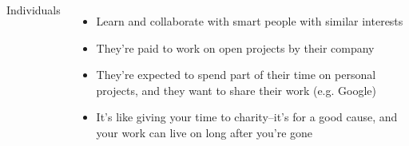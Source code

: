 \documentclass{beamer}
\begin{document}
\begin{frame}
\begin{columns}
    \begin{Large}Individuals\end{Large}
    \begin{itemize}
    \item Learn and collaborate with smart people with similar interests
    \item They're paid to work on open projects by their company
    \item They're expected to spend part of their time on personal projects, and they want to share their work (e.g. Google)
    \item It's like giving your time to charity--it's for a good cause, and your work can live on long after you're gone
    \end{itemize}
  \end{columns}
\end{frame}



\end{document}
